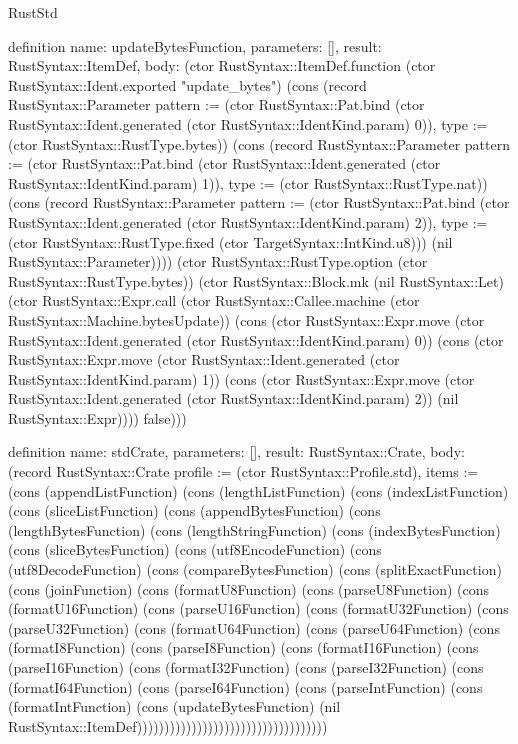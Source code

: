 \begin{lexlean}{RustStd}
\begin{semanticmodule}
definition{
  name: updateBytesFunction,
  parameters: [],
  result: RustSyntax::ItemDef,
  body: (ctor RustSyntax::ItemDef.function (ctor RustSyntax::Ident.exported "update_bytes") (cons (record RustSyntax::Parameter {pattern := (ctor RustSyntax::Pat.bind (ctor RustSyntax::Ident.generated (ctor RustSyntax::IdentKind.param) 0)), type := (ctor RustSyntax::RustType.bytes)}) (cons (record RustSyntax::Parameter {pattern := (ctor RustSyntax::Pat.bind (ctor RustSyntax::Ident.generated (ctor RustSyntax::IdentKind.param) 1)), type := (ctor RustSyntax::RustType.nat)}) (cons (record RustSyntax::Parameter {pattern := (ctor RustSyntax::Pat.bind (ctor RustSyntax::Ident.generated (ctor RustSyntax::IdentKind.param) 2)), type := (ctor RustSyntax::RustType.fixed (ctor TargetSyntax::IntKind.u8))}) (nil RustSyntax::Parameter)))) (ctor RustSyntax::RustType.option (ctor RustSyntax::RustType.bytes)) (ctor RustSyntax::Block.mk (nil RustSyntax::Let) (ctor RustSyntax::Expr.call (ctor RustSyntax::Callee.machine (ctor RustSyntax::Machine.bytesUpdate)) (cons (ctor RustSyntax::Expr.move (ctor RustSyntax::Ident.generated (ctor RustSyntax::IdentKind.param) 0)) (cons (ctor RustSyntax::Expr.move (ctor RustSyntax::Ident.generated (ctor RustSyntax::IdentKind.param) 1)) (cons (ctor RustSyntax::Expr.move (ctor RustSyntax::Ident.generated (ctor RustSyntax::IdentKind.param) 2)) (nil RustSyntax::Expr)))) false)))
}

definition{
  name: stdCrate,
  parameters: [],
  result: RustSyntax::Crate,
  body: (record RustSyntax::Crate {profile := (ctor RustSyntax::Profile.std), items := (cons (appendListFunction) (cons (lengthListFunction) (cons (indexListFunction) (cons (sliceListFunction) (cons (appendBytesFunction) (cons (lengthBytesFunction) (cons (lengthStringFunction) (cons (indexBytesFunction) (cons (sliceBytesFunction) (cons (utf8EncodeFunction) (cons (utf8DecodeFunction) (cons (compareBytesFunction) (cons (splitExactFunction) (cons (joinFunction) (cons (formatU8Function) (cons (parseU8Function) (cons (formatU16Function) (cons (parseU16Function) (cons (formatU32Function) (cons (parseU32Function) (cons (formatU64Function) (cons (parseU64Function) (cons (formatI8Function) (cons (parseI8Function) (cons (formatI16Function) (cons (parseI16Function) (cons (formatI32Function) (cons (parseI32Function) (cons (formatI64Function) (cons (parseI64Function) (cons (parseIntFunction) (cons (formatIntFunction) (cons (updateBytesFunction) (nil RustSyntax::ItemDef))))))))))))))))))))))))))))))))))})
}


\end{semanticmodule}
\end{lexlean}
